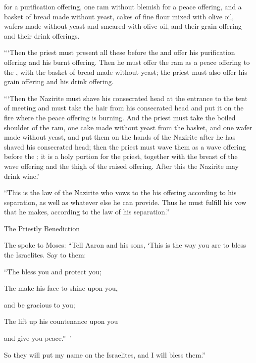 {for a purification
offering, one
ram
without blemish
for a peace offering,
and a basket
of bread made without yeast,
cakes
of fine flour
mixed
with olive oil,
wafers
made without yeast
and smeared
with olive oil,
and their grain offering
and their drink offerings.
\par }{\PP {}“‘Then the priest
must present
all these before
the {}
and offer
his purification
offering and his burnt offering.
Then he must offer
the ram
as a peace offering
to the
{}, with the basket
of bread
made
without yeast;
the priest
must also offer his grain offering
and his drink offering.
\par }{\PP {}“‘Then the Nazirite
must shave
his consecrated
head
at the entrance
to the tent
of meeting
and must take
the hair
from his consecrated
head
and put
it on
the fire
where
the peace offering
is burning.
And the priest
must
take
the boiled
shoulder of the ram,
one
cake
made without yeast
from
the basket,
and one
wafer
made without yeast,
and put
them on
the hands
of the Nazirite
after
he has shaved
his consecrated head;
then
the
priest
must wave
them as a wave offering
before
the {}; it is
a holy
portion for the priest,
together with the breast
of the wave offering
and the thigh
of the raised
offering. After
this the Nazirite
may drink
wine.’
\par }{\PP {}“This
is the law
of the Nazirite
who
vows
to the
{}
his offering
according
to his separation,
as well as whatever
else
he can provide. Thus he must fulfill
his vow
that
he makes,
according
to the law
of his separation.”
\par }{\SH The Priestly Benediction
\par }{\PP {}The
{}
spoke
to
Moses:
“Tell
Aaron
and his sons,
‘This
is the way you are to bless
the Israelites.
Say to them:
\par }{\Q {}“The
{}
bless
you and protect you;
\par }{\Q {}The
{}
make his face
to shine
upon you,
\par }{\Q and be gracious to you;
\par }{\Q {}The
{}
lift up
his countenance
upon
you

\par }{\Q and give
you peace.” ’
\par }{\PP {}So they will put
my name
on
the Israelites,
and I
will bless them.”


}
